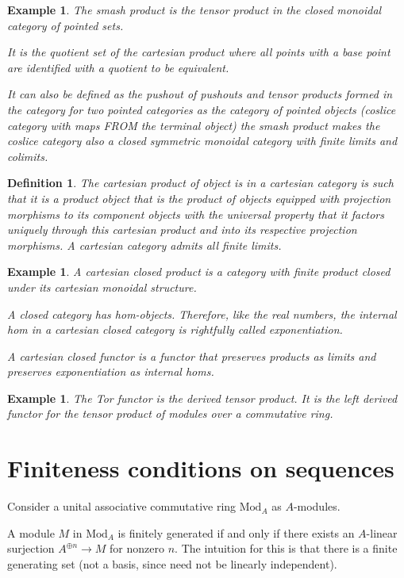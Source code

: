 \documentclass{tufte-book}
\newtheorem{definition}[theorem]{Definition}
\newtheorem{example}[theorem]{Example}
\begin{document}
\begin{example}
  The smash product is the tensor product in the closed monoidal category of pointed sets.

  It is the quotient set of the cartesian product where all points with a base point are identified with a quotient to be equivalent.

  It can also be defined as the pushout of pushouts and tensor products formed in the category for two pointed categories as the category of pointed objects (coslice category with maps FROM the terminal object) the smash product makes the coslice category also a closed symmetric monoidal category with finite limits and colimits.
\end{example}

\begin{definition}
  The cartesian product of object is in a cartesian category is such that it is a product object that is the product of objects equipped with projection morphisms to its component objects with the universal property that it factors uniquely through this cartesian product and into its respective projection morphisms. A cartesian category admits all finite limits.
\end{definition}

\begin{example}
  A cartesian closed product is a category with finite product closed under its cartesian monoidal structure.

  A closed category has hom-objects. Therefore, like the real numbers, the internal hom in a cartesian closed category is rightfully called exponentiation.

  A cartesian closed functor is a functor that preserves products as limits and preserves exponentiation as internal homs.
\end{example}

\begin{example}
  The Tor functor is the derived tensor product. It is the left derived functor for the tensor product of modules over a commutative ring.
\end{example}

\section{Finiteness conditions on sequences}

Consider a unital associative commutative ring $\mathrm{Mod}_A$ as $A$-modules. 

A module
$M$ in $\mathrm{Mod}_A$ is finitely generated 
if and only if there exists an $A$-linear
surjection $A^{\oplus n} \rightarrow M$
for nonzero $n$. The intuition for this is that there is a finite 
generating set (not a basis, since need not be linearly independent).
\end{document}
